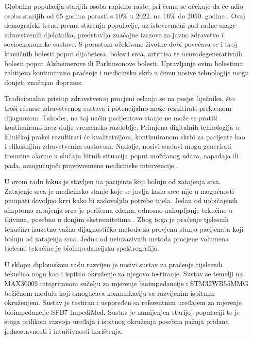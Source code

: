 \documentclass[../diplomski_rad.tex]{subfiles}
\begin{document}
\sloppy

\justifying

Globalna populacija starijih osoba rapidno raste, pri čemu se očekuje da će udio osoba 
starijih od 65 godina porasti s 10\% u 2022. na 16\% do 2050. godine \cite{Chen2023}. 
Ovaj demografski trend prema starenju populacije, uz istovremeni pad radne snage zdravstvenih djelatnika, predstavlja značajne izazove za 
javno zdravstvo i socioekonomske sustave. 
S porastom očekivane životne dobi povećava se i broj kroničnih bolesti poput dijabetesa, 
bolesti srca, artritisa te neurodegenerativnih bolesti poput Alzheimerove ili Parkinsonove bolesti. 
Upravljanje ovim bolestima zahtijeva kontinuirano praćenje i medicinsku skrb u čemu 
nosive tehnologije mogu donjeti značajan doprinos. 

Tradicionalan pristup zdravstvenoj procjeni oslanja se na posjet liječniku, što troši resurse zdravstvenog sustava 
i potencijalno može rezultirati prekasnom dijagnozom. 
Također, na taj način pacijentovo stanje ne može se pratiti kontinuirano kroz dulje vremensko razdoblje.
Primjena digitalnih tehnologija u kliničkoj praksi rezultirati će kvalitetnijom, kontinuiranom skrbi za pacijente kao i 
efikasnijim zdravstvenim sustavom. 
Nadalje, nosivi sustavi mogu generirati trenutne alarme u slučaju hitnih situacija poput moždanog udara, 
napadaja ili pada, omogućujući pravovremene medicinske intervencije \cite{Chen2023}.

U ovom radu fokus je stavljen na pacijente koji boluju od zatajenja srca.
Zatajenje srca je medicinsko stanje koje se javlja kada srce nije u mogućnosti pumpati dovoljno krvi kako bi 
zadovoljilo potrebe tijela. Jedan od uobičajenih simptoma zatajenja srca je periferna edema, odnosno nakupljanje 
tekućine u tkivima, posebno u donjim ekstremitetima \cite{Abassi2022}. Zbog toga je praćenje tjelesnih tekućina izuzetno važna 
dijagnostička metoda za procjenu stanja pacijenata koji boluju od zatajenja srca. Jedna od neinvazivnih metoda 
procjene volumena tjelesne tekućine je bioimpedancijska spektrografija. 

U sklopu diplomskom radu razvijen je nosivi sustav za praćenje tijelesnih tekućina nogu kao i ispitno okruženje za njegovo testiranje. 
Sustav se temelji na MAX30009 integriranom sučelju za mjerenje bioimpedancije i STM32WB55MMG bežičnom modulu koji omogućava komunikaciju 
sa razvijenim ispitnim okruženjem. Sustav je testiran i uspoređen sa referentnim uređajem za mjerenje bioimpedancije SFB7 ImpediMed.
Sustav je namijenjen starijoj populaciji te je stoga prilikom razvoja uređaja i ispitnog okruženja 
posebna pažnja pridana jednostavnosti i intuitivnosti korištenja. 
\end{document}
